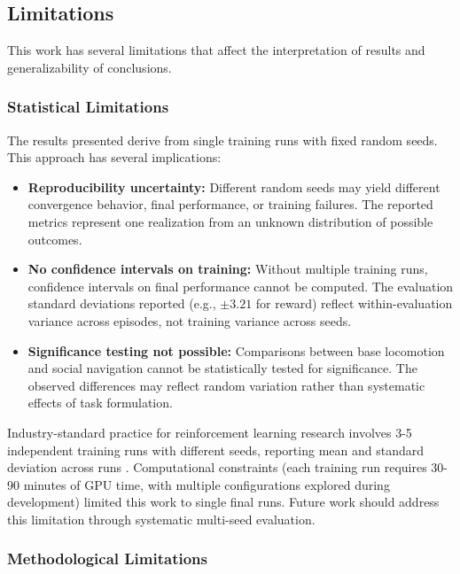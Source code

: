 \documentclass[12pt,a4paper]{article}
\begin{document}
\subsection{Limitations}

This work has several limitations that affect the interpretation of results and generalizability of conclusions.

\subsubsection{Statistical Limitations}

The results presented derive from single training runs with fixed random seeds. This approach has several implications:

\begin{itemize}
    \item \textbf{Reproducibility uncertainty:} Different random seeds may yield different convergence behavior, final performance, or training failures. The reported metrics represent one realization from an unknown distribution of possible outcomes.

    \item \textbf{No confidence intervals on training:} Without multiple training runs, confidence intervals on final performance cannot be computed. The evaluation standard deviations reported (e.g., $\pm 3.21$ for reward) reflect within-evaluation variance across episodes, not training variance across seeds.

    \item \textbf{Significance testing not possible:} Comparisons between base locomotion and social navigation cannot be statistically tested for significance. The observed differences may reflect random variation rather than systematic effects of task formulation.
\end{itemize}

Industry-standard practice for reinforcement learning research involves 3-5 independent training runs with different seeds, reporting mean and standard deviation across runs \parencite{henderson2018deep}. Computational constraints (each training run requires 30-90 minutes of GPU time, with multiple configurations explored during development) limited this work to single final runs. Future work should address this limitation through systematic multi-seed evaluation.

\subsubsection{Methodological Limitations}
\end{document}
